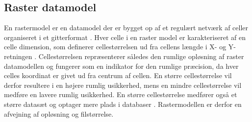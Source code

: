 \subsection{Raster datamodel} \label{Afsnit: Raster data model}

En rastermodel er en datamodel der er bygget op af et regulært netværk af celler organiseret i et gitterformat \citep{bolstad_gis_2022, esri_raster}. Hver celle i en raster model er karakteriseret af en celle dimension, som definerer cellestørrelsen ud fra cellens længde i X- og Y-retningen \citep{bolstad_gis_2022}. Cellestørrelsen repræsenterer således den rumlige opløsning af raster datamodellen og fungerer som en indikator for den rumlige præcision, da hver celles koordinat er givet ud fra centrum af cellen. En større cellestørrelse vil derfor resultere i en højere rumlig usikkerhed, mens en mindre cellestørrelse vil medføre en lavere rumlig usikkerhed. En større cellestørrelse medfører også et større datasæt og optager mere plads i databaser \citep{bolstad_gis_2022}. Rastermodellen er derfor en afvejning af opløsning og filstørrelse.\\

